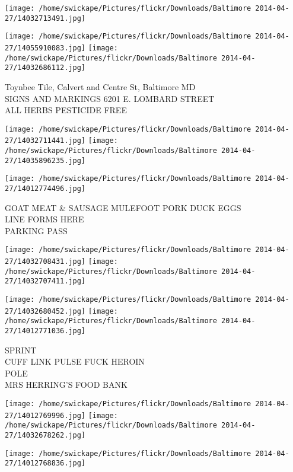 \documentclass[10pt,letterpaper]{article}
\begin{document}
\texttt{[image: /home/swickape/Pictures/flickr/Downloads/Baltimore 2014-04-27/14032713491.jpg]}

\vspace{0.25in}
\texttt{[image: /home/swickape/Pictures/flickr/Downloads/Baltimore 2014-04-27/14055910083.jpg]}
\texttt{[image: /home/swickape/Pictures/flickr/Downloads/Baltimore 2014-04-27/14032686112.jpg]}

Toynbee Tile, Calvert and Centre St, Baltimore MD\\
SIGNS AND MARKINGS 6201 E. LOMBARD STREET\\
ALL HERBS PESTICIDE FREE
\pagebreak

\texttt{[image: /home/swickape/Pictures/flickr/Downloads/Baltimore 2014-04-27/14032711441.jpg]}
\texttt{[image: /home/swickape/Pictures/flickr/Downloads/Baltimore 2014-04-27/14035896235.jpg]}

\vspace{0.25in}
\texttt{[image: /home/swickape/Pictures/flickr/Downloads/Baltimore 2014-04-27/14012774496.jpg]}

GOAT MEAT \& SAUSAGE MULEFOOT PORK DUCK EGGS\\
LINE FORMS HERE\\
PARKING PASS
\pagebreak

\texttt{[image: /home/swickape/Pictures/flickr/Downloads/Baltimore 2014-04-27/14032708431.jpg]}
\texttt{[image: /home/swickape/Pictures/flickr/Downloads/Baltimore 2014-04-27/14032707411.jpg]}

\texttt{[image: /home/swickape/Pictures/flickr/Downloads/Baltimore 2014-04-27/14032680452.jpg]}
\texttt{[image: /home/swickape/Pictures/flickr/Downloads/Baltimore 2014-04-27/14012771036.jpg]}

SPRINT\\
CUFF LINK PULSE FUCK HEROIN\\
POLE\\
MRS HERRING'S FOOD BANK
\pagebreak

\texttt{[image: /home/swickape/Pictures/flickr/Downloads/Baltimore 2014-04-27/14012769996.jpg]}
\texttt{[image: /home/swickape/Pictures/flickr/Downloads/Baltimore 2014-04-27/14032678262.jpg]}

\texttt{[image: /home/swickape/Pictures/flickr/Downloads/Baltimore 2014-04-27/14012768836.jpg]}
\end{document}

